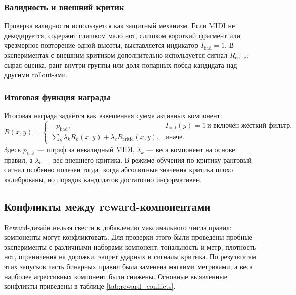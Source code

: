 \documentclass[a4paper,12pt]{extarticle}
\begin{document}
\subsubsection{Валидность и внешний критик}

Проверка валидности используется как защитный механизм. Если MIDI не
декодируется, содержит слишком мало нот, слишком короткий фрагмент или
чрезмерное повторение одной высоты, выставляется индикатор
$I_{\mathrm{bad}}=1$. В экспериментах с внешним критиком дополнительно
используется сигнал $R_{\mathrm{critic}}$: сырая оценка, ранг внутри
группы или доля попарных побед кандидата над другими rollout-ами.

\subsubsection{Итоговая функция награды}

Итоговая награда задаётся как взвешенная сумма активных компонент:
\[
R(x,y)=
\begin{cases}
-p_{\mathrm{bad}}, & I_{\mathrm{bad}}(y)=1 \ \text{и включён жёсткий фильтр},\\
\sum_k \lambda_k R_k(x,y)+\lambda_c R_{\mathrm{critic}}(x,y), & \text{иначе}.
\end{cases}
\]
Здесь $p_{\mathrm{bad}}$ --- штраф за невалидный MIDI, $\lambda_k$ ---
веса компонент на основе правил, а $\lambda_c$ --- вес внешнего критика. В
режиме обучения по критику ранговый сигнал особенно полезен тогда, когда
абсолютные значения критика плохо калиброваны, но порядок кандидатов
достаточно информативен.

\subsection{Конфликты между reward-компонентами}

Reward-дизайн нельзя свести к добавлению максимального числа правил:
компоненты могут конфликтовать. Для проверки этого были проведены
пробные эксперименты с различными наборами компонент: тональность и метр,
плотность нот, ограничения на дорожки, запрет ударных и сигналы
критика. По результатам этих запусков часть бинарных правил была
заменена мягкими метриками, а веса наиболее агрессивных компонент были
снижены. Основные выявленные конфликты приведены в таблице
\ref{tab:reward_conflicts}.
\end{document}
